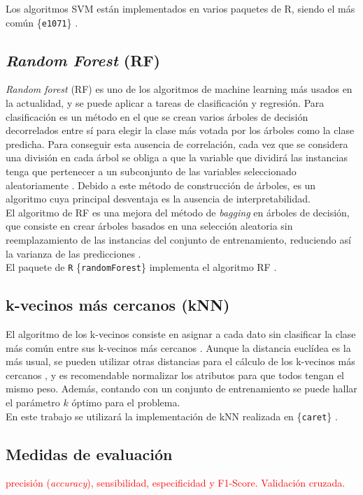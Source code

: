 Los algoritmos SVM están implementados en varios paquetes de R, siendo el más común \{\texttt{e1071}\} \cite{Meyer2019}.

\subsection{\textit{Random Forest} (RF)}

\textit{Random forest} (RF) es uno de los algoritmos de machine learning más usados en la actualidad, y se puede aplicar a tareas de clasificación y regresión. Para clasificación es un método en el que se crean varios árboles de decisión decorrelados entre sí para elegir la clase más votada por los árboles como la clase predicha. Para conseguir esta ausencia de correlación, cada vez que se considera una división en cada árbol se obliga a que la variable que dividirá las instancias tenga que pertenecer a un subconjunto de las variables seleccionado aleatoriamente \cite{Breiman2001, Breiman2002}. Debido a este método de construcción de árboles, es un algoritmo cuya principal desventaja es la ausencia de interpretabilidad.\\

El algoritmo de RF es una mejora del método de \textit{bagging} en árboles de decisión, que consiste en crear árboles basados en una selección aleatoria sin reemplazamiento de las instancias del conjunto de entrenamiento, reduciendo así la varianza de las predicciones \cite{Breiman1996}.\\

El paquete de \texttt{R} \{\texttt{randomForest}\} implementa el algoritmo RF \cite{Liaw2002}.

\subsection{k-vecinos más cercanos (kNN)}

El algoritmo de los k-vecinos consiste en asignar a cada dato sin clasificar la clase más común entre sus k-vecinos más cercanos \cite{Altman1992}. Aunque la distancia euclídea es la más usual, se pueden utilizar otras distancias para el cálculo de los k-vecinos más cercanos \cite{Hu2016}, y es recomendable normalizar los atributos para que todos tengan el mismo peso. Además, contando con un conjunto de entrenamiento se puede hallar el parámetro $k$ óptimo para el problema.\\

En este trabajo se utilizará la implementación de kNN realizada en \{\texttt{caret}\} \cite{Kuhn2020}.

\subsection{Medidas de evaluación}

\textcolor{red}{precisión (\textit{accuracy}), sensibilidad, especificidad y F1-Score. Validación cruzada.}
